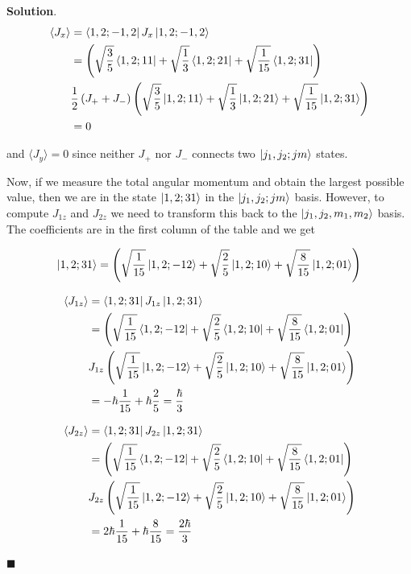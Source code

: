 \documentclass[12pt]{article}
\theoremstyle{definition}
\newenvironment{s}{%
        \begin{trivlist} \item \textbf{Solution}. }{%
            \hspace*{\fill} $\blacksquare$\end{trivlist}}%
\begin{document}
{\begin{s}
\begin{align*}
\langle J_x \rangle &= \bra{1,2;-1,2} J_x \ket{1,2;-1,2} \\
&= \left(\sqrt{\frac{3}{5}}\bra{1,2;1 1} + \sqrt{\frac{1}{3}}\bra{1,2;2 1} + \sqrt{\frac{1}{15}}\bra{1,2;3 1}\right)\\
&\frac{1}{2}\left(J_+ + J_-\right)\left(\sqrt{\frac{3}{5}}\ket{1,2;1 1} + \sqrt{\frac{1}{3}}\ket{1,2;2 1} + \sqrt{\frac{1}{15}}\ket{1,2;3 1}\right)\\
&= 0
\end{align*}

and $\langle J_{y} \rangle = 0$ since neither $J_+$ nor $J_-$ connects two $\ket{j_1,j_2;jm}$ states.

Now, if we measure the total angular momentum and obtain the largest possible value, then we are in the state $\ket{1,2;31}$ in the $\ket{j_1,j_2;jm}$ basis. However, to compute $J_{1z}$ and $J_{2z}$ we need to transform this back to the $\ket{j_1, j_2, m_1, m_2}$ basis. The coefficients are in the first column of the table and we get

\begin{align*}
\ket{1,2;31} = \left(\sqrt{\frac{1}{15}}\ket{1,2;-12} + \sqrt{\frac{2}{5}}\ket{1,2;10} + \sqrt{\frac{8}{15}}\ket{1,2;01}\right)
\end{align*}

\begin{align*}
\langle J_{1z} \rangle &= \bra{1,2;31} J_{1z}  \ket{1,2;31} \\
&= \left(\sqrt{\frac{1}{15}}\bra{1,2;-12} + \sqrt{\frac{2}{5}}\bra{1,2;10} + \sqrt{\frac{8}{15}}\bra{1,2;01}\right)\\
&J_{1z}\left(\sqrt{\frac{1}{15}}\ket{1,2;-12} + \sqrt{\frac{2}{5}}\ket{1,2;10} + \sqrt{\frac{8}{15}}\ket{1,2;01}\right)\\
&= -\hbar\frac{1}{15} + \hbar\frac{2}{5} =  \frac{\hbar}{3}
\end{align*}

\begin{align*}
\langle J_{2z} \rangle &= \bra{1,2;31} J_{2z}  \ket{1,2;31} \\
&= \left(\sqrt{\frac{1}{15}}\bra{1,2;-12} + \sqrt{\frac{2}{5}}\bra{1,2;10} + \sqrt{\frac{8}{15}}\bra{1,2;01}\right)\\
&J_{2z}\left(\sqrt{\frac{1}{15}}\ket{1,2;-12} + \sqrt{\frac{2}{5}}\ket{1,2;10} + \sqrt{\frac{8}{15}}\ket{1,2;01}\right)\\
&= 2\hbar\frac{1}{15} + \hbar\frac{8}{15} = \frac{2\hbar}{3}
\end{align*}


\end{s}}
\end{document}
